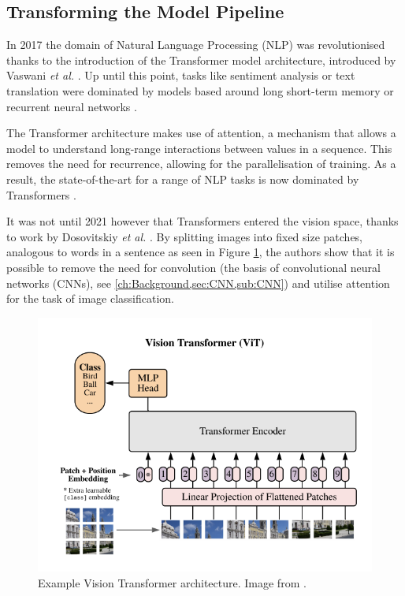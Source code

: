 \subsection{Transforming the Model Pipeline}\label{ch:Conclusion,sec:FutureWork,sub:Transformers}

In 2017 the domain of Natural Language Processing (NLP) was revolutionised thanks to the introduction of the Transformer model architecture, introduced by Vaswani \textit{et al.} \cite{vaswani_attention_2017}. Up until this point, tasks like sentiment analysis or text translation were dominated by models based around long short-term memory \cite{hochreiter_long_1997} or recurrent neural networks \cite{rumelhart_learning_1985}. 

The Transformer architecture makes use of attention, a mechanism that allows a model to understand long-range interactions between values in a sequence. This removes the need for recurrence, allowing for the parallelisation of training. As a result, the state-of-the-art for a range of NLP tasks is now dominated by Transformers \cite{brown_language_2020, devlin_bert_2019, ng_facebook_2019, wolf_transformers_2020}. 

It was not until 2021 however that Transformers entered the vision space, thanks to work by Dosovitskiy \textit{et al.} \cite{dosovitskiy_image_2021}. By splitting images into fixed size patches, analogous to words in a sentence as seen in Figure \ref{fig:vit}, the authors show that it is possible to remove the need for convolution (the basis of convolutional neural networks (CNNs), see \ref{ch:Background,sec:CNN,sub:CNN}) and utilise attention for the task of image classification. 

\begin{figure}[h]
	\begin{center}
		\includegraphics[scale=0.7]{Chapter7/figs/vit.png}
	\end{center}
	\caption[Example Vision Transformer architecture.]{Example Vision Transformer architecture. Image from \cite{dosovitskiy_image_2021}.}
	\label{fig:vit}
\end{figure}

